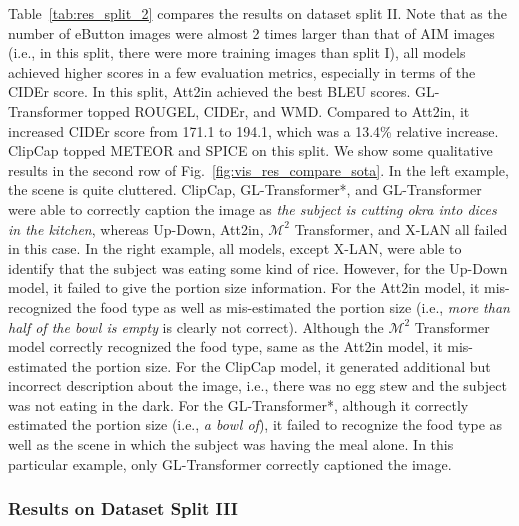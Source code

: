 \documentclass[journal]{IEEEtran}
\begin{document}
Table~\ref{tab:res_split_2} compares the results on dataset split II. Note that as the number of eButton images were almost 2 times larger than that of AIM images (i.e., in this split, there were more training images than split I), all models achieved higher scores in a few evaluation metrics, especially in terms of the CIDEr score. In this split, Att2in achieved the best BLEU scores. GL-Transformer topped ROUGEL, CIDEr, and WMD. Compared to Att2in, it increased CIDEr score from 171.1 to 194.1, which was a 13.4\% relative increase. ClipCap topped METEOR and SPICE on this split. We show some qualitative results in the second row of Fig.~\ref{fig:vis_res_compare_sota}. In the left example, the scene is quite cluttered. ClipCap, GL-Transformer*, and GL-Transformer were able to correctly caption the image as \textit{the subject is cutting okra into dices in the kitchen}, whereas Up-Down, Att2in, $\mathcal{M}^2$ Transformer, and X-LAN all failed in this case. In the right example, all models, except X-LAN, were able to identify that the subject was eating some kind of rice. However, for the Up-Down model, it failed to give the portion size information. For the Att2in model, it mis-recognized the food type as well as mis-estimated the portion size (i.e., \textit{more than half of the bowl is empty} is clearly not correct). Although the $\mathcal{M}^2$ Transformer model correctly recognized the food type, same as the Att2in model, it mis-estimated the portion size. For the ClipCap model, it generated additional but incorrect description about the image, i.e., there was no egg stew and the subject was not eating in the dark. For the GL-Transformer*, although it correctly estimated the portion size (i.e., \textit{a bowl of}), it failed to recognize the food type as well as the scene in which the subject was having the meal alone. In this particular example, only GL-Transformer correctly captioned the image.












\subsubsection{Results on Dataset Split III}
\end{document}
